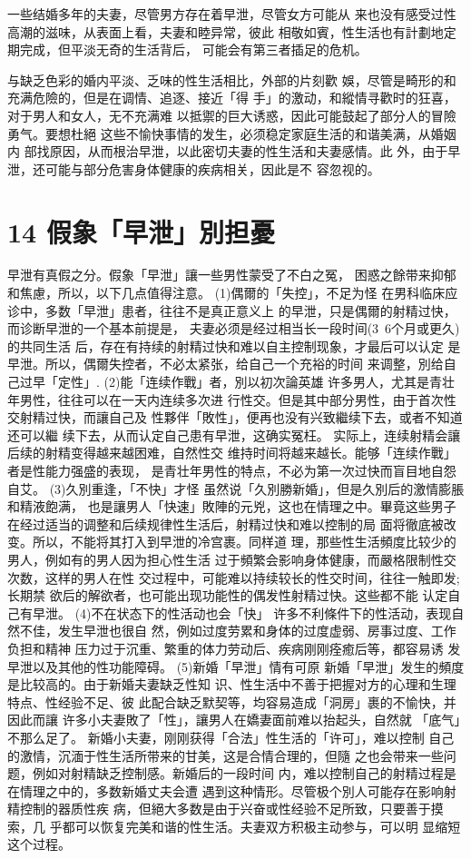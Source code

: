 \documentclass[12pt,UTF8]{ctexbook}
\begin{document}
一些结婚多年的夫妻，尽管男方存在着早泄，尽管女方可能从
来也没有感受过性高潮的滋味，从表面上看，夫妻和睦异常，彼此
相敬如賓，性生活也有計劃地定期完成，但平淡无奇的生活背后，
可能会有第三者插足的危机。

与缺乏色彩的婚内平淡、乏味的性生活相比，外部的片刻歡
娛，尽管是畸形的和充满危險的，但是在调情、追逐、接近「得
手」的激动，和縱情寻歡时的狂喜，对于男人和女人，无不充满难
以抵禦的巨大诱惑，因此可能鼓起了部分人的冒險勇气。要想杜絕
这些不愉快事情的发生，必须稳定家庭生活的和谐美满，从婚姻内
部找原因，从而根治早泄，以此密切夫妻的性生活和夫妻感情。此
外，由于早泄，还可能与部分危害身体健康的疾病相关，因此是不
容忽视的。

\section{14 假象「早泄」別担憂}

早泄有真假之分。假象「早泄」讓一些男性蒙受了不白之冤，
困惑之餘带来抑郁和焦慮，所以，以下几点值得注意。
(1)偶爾的「失控」，不足为怪
在男科临床应诊中，多数「早泄」患者，往往不是真正意义上
的早泄，只是偶爾的射精过快，而诊断早泄的一个基本前提是，
夫妻必须是经过相当长一段时间(3~6个月或更久)的共同生活
后，存在有持续的射精过快和难以自主控制现象，才最后可以认定
是早泄。所以，偶爾失控者，不必太紧张，给自己一个充裕的时间
来调整，別给自己过早「定性」.
(2)能「连续作戰」者，別以初次論英雄
许多男人，尤其是青壮年男性，往往可以在一天内连续多次进
行性交。但是其中部分男性，由于首次性交射精过快，而讓自己及
性夥伴「敗性」，便再也没有兴致繼续下去，或者不知道还可以繼
续下去，从而认定自己患有早泄，这确实冤枉。
实际上，连续射精会讓后续的射精变得越来越困难，自然性交
维持时间将越来越长。能够「连续作戰」者是性能力强盛的表现，
是青壮年男性的特点，不必为第一次过快而盲目地自怨自艾。
(3)久別重逢，「不快」才怪
虽然说「久別勝新婚」，但是久別后的激情膨脹和精液飽满，
也是讓男人「快速」敗陣的元兇，这也在情理之中。畢竟这些男子
在经过适当的调整和后续规律性生活后，射精过快和难以控制的局
面将徹底被改变。所以，不能将其打入到早泄的冷宫裹。同样道
理，那些性生活頻度比较少的男人，例如有的男人因为担心性生活
过于頻繁会影响身体健康，而嚴格限制性交次数，这样的男人在性
交过程中，可能难以持续较长的性交时间，往往一触即发;长期禁
欲后的解欲者，也可能出现功能性的偶发性射精过快。这些都不能
认定自己有早泄。
(4)不在状态下的性活动也会「快」
许多不利條件下的性活动，表现自然不佳，发生早泄也很自
然，例如过度劳累和身体的过度虚弱、房事过度、工作负担和精神
压力过于沉重、繁重的体力劳动后、疾病刚刚痊癒后等，都容易诱
发早泄以及其他的性功能障碍。
(5)新婚「早泄」情有可原
新婚「早泄」发生的頻度是比较高的。由于新婚夫妻缺乏性知
识、性生活中不善于把握对方的心理和生理特点、性经验不足、彼
此配合缺乏默契等，均容易造成「洞房」裹的不愉快，并因此而讓
许多小夫妻敗了「性」，讓男人在嬌妻面前难以抬起头，自然就
「底气」不那么足了。
新婚小夫妻，刚刚获得「合法」性生活的「许可」，难以控制
自己的激情，沉湎于性生活所带来的甘美，这是合情合理的，但隨
之也会带来一些问题，例如对射精缺乏控制感。新婚后的一段时间
内，难以控制自己的射精过程是在情理之中的，多数新婚丈夫会遭
遇到这种情形。尽管极个別人可能存在影响射精控制的器质性疾
病，但絕大多数是由于兴奋或性经验不足所致，只要善于摸索，几
乎都可以恢复完美和谐的性生活。夫妻双方积极主动参与，可以明
显缩短这个过程。
\end{document}
